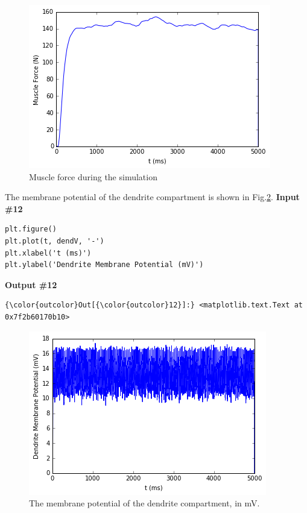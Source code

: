 \documentclass{article}
\makeatletter
\def\maxwidth{\ifdim\Gin@nat@width>\linewidth\linewidth
    \else\Gin@nat@width\fi}
\let\Oldincludegraphics\includegraphics
\renewcommand{\includegraphics}[1]{\Oldincludegraphics[width=.8\maxwidth]{#1}}
\makeatother
\begin{document}
    \begin{figure}
        \begin{center}
        \includegraphics{MNPoolWithDescendingCommand_files/MNPoolWithDescendingCommand_16_1.png}
        \end{center}
        \caption{Muscle force during the simulation}
        \label{fig:force}
    \end{figure}
    
    The membrane potential of the dendrite compartment is shown in
Fig.\ref{fig:dendV}.
\newline\textbf{Input \#{}12}\begin{verbatim}
plt.figure()
plt.plot(t, dendV, '-')
plt.xlabel('t (ms)')
plt.ylabel('Dendrite Membrane Potential (mV)')
\end{verbatim}\textbf{Output \#{}12}
            \begin{Verbatim}[commandchars=\\\{\}]
{\color{outcolor}Out[{\color{outcolor}12}]:} <matplotlib.text.Text at 0x7f2b60170b10>
\end{Verbatim}
        
    \begin{figure}
        \begin{center}
        \includegraphics{MNPoolWithDescendingCommand_files/MNPoolWithDescendingCommand_18_1.png}
        \end{center}
        \caption{The membrane potential of the dendrite compartment, in mV.}
        \label{fig:dendV}
    \end{figure}
    
\end{document}
